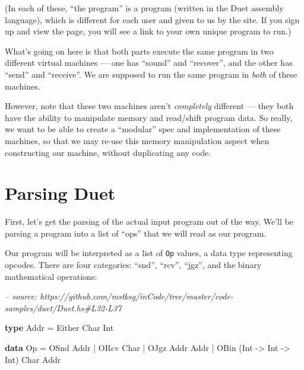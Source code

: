 \documentclass[]{article}
\newenvironment{Shaded}{}{}
\newcommand{\CommentTok}[1]{\textcolor[rgb]{0.38,0.63,0.69}{\textit{#1}}}
\newcommand{\DataTypeTok}[1]{\textcolor[rgb]{0.56,0.13,0.00}{#1}}
\newcommand{\FunctionTok}[1]{\textcolor[rgb]{0.02,0.16,0.49}{#1}}
\newcommand{\KeywordTok}[1]{\textcolor[rgb]{0.00,0.44,0.13}{\textbf{#1}}}
\newcommand{\NormalTok}[1]{#1}
\newcommand{\OtherTok}[1]{\textcolor[rgb]{0.00,0.44,0.13}{#1}}
\begin{document}
(In each of these, ``the program'' is a program (written in the Duet assembly
language), which is different for each user and given to us by the site. If you
sign up and view the page, you will see a link to your own unique program to
run.)

What's going on here is that both parts execute the same program in two
different virtual machines --- one has ``sound'' and ``recover'', and the other
has ``send'' and ``receive''. We are supposed to run the same program in
\emph{both} of these machines.

However, note that these two machines aren't \emph{completely} different ---
they both have the ability to manipulate memory and read/shift program data. So
really, we want to be able to create a ``modular'' spec and implementation of
these machines, so that we may re-use this memory manipulation aspect when
constructing our machine, without duplicating any code.

\hypertarget{parsing-duet}{%
\section{Parsing Duet}\label{parsing-duet}}

First, let's get the parsing of the actual input program out of the way. We'll
be parsing a program into a list of ``ops'' that we will read as our program.

Our program will be interpreted as a list of \texttt{Op} values, a data type
representing opcodes. There are four categories: ``snd'', ``rcv'', ``jgz'', and
the binary mathematical operations:

\begin{Shaded}
\begin{Highlighting}[]
\CommentTok{-- source: https://github.com/mstksg/inCode/tree/master/code-samples/duet/Duet.hs#L32-L37}

\KeywordTok{type} \DataTypeTok{Addr} \FunctionTok{=} \DataTypeTok{Either} \DataTypeTok{Char} \DataTypeTok{Int}

\KeywordTok{data} \DataTypeTok{Op} \FunctionTok{=} \DataTypeTok{OSnd} \DataTypeTok{Addr}
        \FunctionTok{|} \DataTypeTok{ORcv} \DataTypeTok{Char}
        \FunctionTok{|} \DataTypeTok{OJgz} \DataTypeTok{Addr} \DataTypeTok{Addr}
        \FunctionTok{|} \DataTypeTok{OBin}\NormalTok{ (}\DataTypeTok{Int} \OtherTok{->} \DataTypeTok{Int} \OtherTok{->} \DataTypeTok{Int}\NormalTok{) }\DataTypeTok{Char} \DataTypeTok{Addr}
\end{Highlighting}
\end{Shaded}
\end{document}
